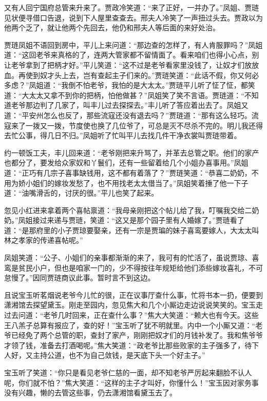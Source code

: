 \documentclass[12pt,oneside]{book}
\begin{document}
又有人回宁国府总管来升来了。贾政冷笑道：“来了正好，一并办了。”凤姐、贾琏见状便寻借口告退，说到下人屋里查查去。邢夫人冷笑了一声扭过头去。贾政以为他两个乏了，就让他两个先回去，他仍和邢夫人等后面的来好处治。

贾琏凤姐不语回到房中，平儿上来问道：“那边查的怎样了，有人肯服罪吗？”凤姐道：“这回老爷来真格的了，连两大管家都不留情面了。看来咱们也得小心点，别让老爷拿到了把柄才好。”平儿笑道：“这不过是老爷看家里没钱了，让奴才们放放血。再使到奴才头上去，岂有查起主子们来的。”贾琏笑道：“此话不假，你又何必多虑？”凤姐道：“我倒不怕老爷，我怕的是大太太。”贾琏平儿听了怔了怔，都笑道：“大太太又拿不到你的把柄，怕他做甚？”凤姐笑了笑不言语。贾琏道：“不知道老爷那边判了几家了，叫丰儿过去探探去。”丰儿听了答应着出去了。凤姐又道：“平安州怎么也反了，那些流寇还没有退去吗？”贾琏道：“那有这么轻巧。流寇来了一拨又一拨，节度使也换了几位爷了，可总是灭不尽杀不完的。明儿我还得去忙公事，得几日不归。”凤姐听了忙叫平儿去找几件干净衣裳叫贾琏带着。

约一顿饭工夫，丰儿回来道：“老爷刚把来升骂了，并革去总管之职。他们的家产也都分了，要发给众家奴和丫鬟们，还有一些留着给几个小姐办喜事用。”凤姐道：“正巧有几宗子喜事缺钱用，这不都有着落了？”贾琏笑道：“恭喜二奶奶，不用为娇小姐们的嫁妆发愁了，也不用找老太太借当了。”凤姐笑着捶了他一下子道：“油嘴滑舌的，讨厌的很。”平儿也笑了起来。

忽见小红进来拿着两个喜帖禀道：“我母亲刚把这个帖儿给了我，叮嘱我交给二奶奶。”凤姐接过来递与贾琏，笑道：“这又是那个园子里有人婚嫁了。”贾琏看了道：“是那府里的小子贾琼要娶亲，还有一宗是贾㻞的妹子喜鸾要嫁人，大太太叫林之孝家的传递喜帖呢。”

凤姐笑道：“公子、小姐们的亲事都渐渐的来了，我可有的忙活了，虽说贾琼、喜鸾是贫民小户，但也是咱家一门的，少不得按往年规矩给他们添些嫁妆喜礼，不可怠慢了。”因同贾琏商议此事。暂时言不到这边。

且说宝玉听茗烟说老爷今儿忙的很，正在议事厅查什么事，忙将书本一扔，便要到潇湘馆去探望黛玉。刚走至园内，忽见焦大和几个小厮边走边说说笑笑的。宝玉走过去问道：“老爷几时回来，正在查什么事？”焦大大笑道：“赖大也有今天。这些王八羔子总算有报应了，查的好！”宝玉听了犹不明就里。内中一个小厮又道：“老爷已经免了两个总管的职，查封了家产，刚刚把奴才们的月钱补发了。我和焦爷爷才领了钱，准备去打酒喝呢。”焦大笑道：“政老爷比那些败家的主子强多了，待下人好，又主持公道，也不为自己敛钱，是天底下头一个好主子。”

宝玉听了笑道：“你只是看见老爷仁慈的一面，却不知老爷严厉起来翻脸不认人呢，你们就不怕？”焦大笑道：“这样的主子才叫好，你懂什么！”宝玉因对家务事没有兴趣，懒的去管这些事，仍去潇湘馆看黛玉去了。
\end{document}
